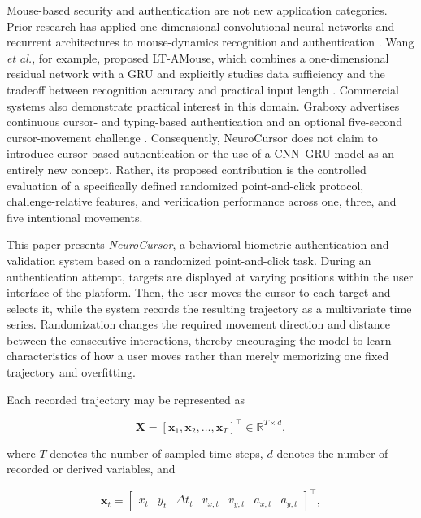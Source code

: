 \documentclass[conference]{IEEEtran}
\begin{document}
Mouse-based security and authentication are not new application categories. Prior research has applied one-dimensional convolutional neural networks and recurrent architectures to mouse-dynamics recognition and authentication \cite{antalFejer2020,wang2025Mouse}. Wang \textit{et al.}, for example, proposed LT-AMouse, which combines a one-dimensional residual network with a GRU and explicitly studies data sufficiency and the tradeoff between recognition accuracy and practical input length \cite{wang2025Mouse}. Commercial systems also demonstrate practical interest in this domain. Graboxy advertises continuous cursor- and typing-based authentication and an optional five-second cursor-movement challenge \cite{graboxyContinuous,graboxyChallenge}. Consequently, NeuroCursor does not claim to introduce cursor-based authentication or the use of a CNN--GRU model as an entirely new concept. Rather, its proposed contribution is the controlled evaluation of a specifically defined randomized point-and-click protocol, challenge-relative features, and verification performance across one, three, and five intentional movements.

This paper presents \textit{NeuroCursor}, a behavioral biometric authentication and validation system based on a randomized point-and-click task. During an authentication attempt, targets are displayed at varying positions within the user interface of the platform. Then, the user moves the cursor to each target and selects it, while the system records the resulting trajectory as a multivariate time series. Randomization changes the required movement direction and distance between the consecutive interactions, thereby encouraging the model to learn characteristics of how a user moves rather than merely memorizing one fixed trajectory and overfitting. 

Each recorded trajectory may be represented as 

\begin{equation}
\mathbf{X}
=
\left[
\mathbf{x}_1,
\mathbf{x}_2,
\ldots,
\mathbf{x}_T
\right]^{\top}
\in
\mathbb{R}^{T \times d},
\label{eq:trajectory_matrix}
\end{equation}

where $T$ denotes the number of sampled time steps, $d$ denotes the number of recorded or derived variables, and 

\begin{equation}
\mathbf{x}_t = 
\begin{bmatrix}
x_t &
y_t &
\Delta t_t & 
v_{x,t} & 
v_{y,t} & 
a_{x,t} & 
a_{y,t}
\end{bmatrix}^{\top},
\label{eq:trajectory_vector}
\end{equation}
\end{document}
